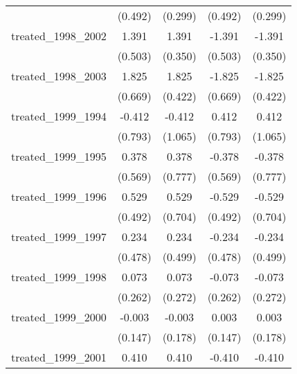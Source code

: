 {\begin{tabular}{l*{4}{c}}
            &     (0.492)         &     (0.299)         &     (0.492)         &     (0.299)         \\
[1em]
treated\_1998\_2002&       1.391\sym{**} &       1.391\sym{***}&      -1.391\sym{**} &      -1.391\sym{***}\\
            &     (0.503)         &     (0.350)         &     (0.503)         &     (0.350)         \\
[1em]
treated\_1998\_2003&       1.825\sym{**} &       1.825\sym{***}&      -1.825\sym{**} &      -1.825\sym{***}\\
            &     (0.669)         &     (0.422)         &     (0.669)         &     (0.422)         \\
[1em]
treated\_1999\_1994&      -0.412         &      -0.412         &       0.412         &       0.412         \\
            &     (0.793)         &     (1.065)         &     (0.793)         &     (1.065)         \\
[1em]
treated\_1999\_1995&       0.378         &       0.378         &      -0.378         &      -0.378         \\
            &     (0.569)         &     (0.777)         &     (0.569)         &     (0.777)         \\
[1em]
treated\_1999\_1996&       0.529         &       0.529         &      -0.529         &      -0.529         \\
            &     (0.492)         &     (0.704)         &     (0.492)         &     (0.704)         \\
[1em]
treated\_1999\_1997&       0.234         &       0.234         &      -0.234         &      -0.234         \\
            &     (0.478)         &     (0.499)         &     (0.478)         &     (0.499)         \\
[1em]
treated\_1999\_1998&       0.073         &       0.073         &      -0.073         &      -0.073         \\
            &     (0.262)         &     (0.272)         &     (0.262)         &     (0.272)         \\
[1em]
treated\_1999\_2000&      -0.003         &      -0.003         &       0.003         &       0.003         \\
            &     (0.147)         &     (0.178)         &     (0.147)         &     (0.178)         \\
[1em]
treated\_1999\_2001&       0.410\sym{*}  &       0.410         &      -0.410\sym{*}  &      -0.410         \\

\end{tabular}}
